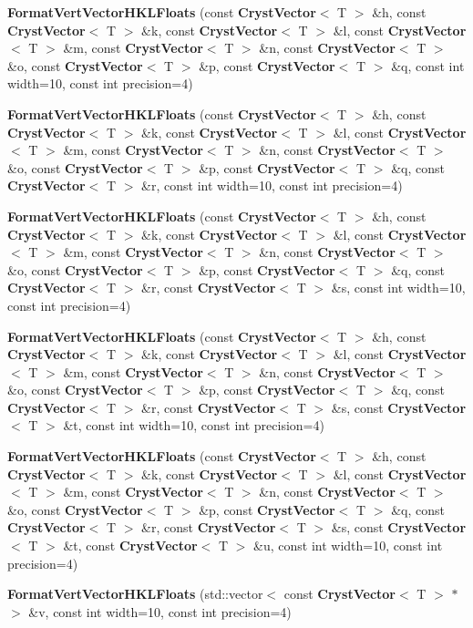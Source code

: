\begin{DoxyCompactItemize}
\item 
{\bfseries FormatVertVectorHKLFloats} (const {\bf CrystVector}$<$ T $>$ \&h, const {\bf CrystVector}$<$ T $>$ \&k, const {\bf CrystVector}$<$ T $>$ \&l, const {\bf CrystVector}$<$ T $>$ \&m, const {\bf CrystVector}$<$ T $>$ \&n, const {\bf CrystVector}$<$ T $>$ \&o, const {\bf CrystVector}$<$ T $>$ \&p, const {\bf CrystVector}$<$ T $>$ \&q, const int width=10, const int precision=4)\label{a00033_acb9f12201a79cd8e7007a9d25da07ff4}

\item 
{\bfseries FormatVertVectorHKLFloats} (const {\bf CrystVector}$<$ T $>$ \&h, const {\bf CrystVector}$<$ T $>$ \&k, const {\bf CrystVector}$<$ T $>$ \&l, const {\bf CrystVector}$<$ T $>$ \&m, const {\bf CrystVector}$<$ T $>$ \&n, const {\bf CrystVector}$<$ T $>$ \&o, const {\bf CrystVector}$<$ T $>$ \&p, const {\bf CrystVector}$<$ T $>$ \&q, const {\bf CrystVector}$<$ T $>$ \&r, const int width=10, const int precision=4)\label{a00033_a8d5ee53cb53c61b1909657e1e696b86b}

\item 
{\bfseries FormatVertVectorHKLFloats} (const {\bf CrystVector}$<$ T $>$ \&h, const {\bf CrystVector}$<$ T $>$ \&k, const {\bf CrystVector}$<$ T $>$ \&l, const {\bf CrystVector}$<$ T $>$ \&m, const {\bf CrystVector}$<$ T $>$ \&n, const {\bf CrystVector}$<$ T $>$ \&o, const {\bf CrystVector}$<$ T $>$ \&p, const {\bf CrystVector}$<$ T $>$ \&q, const {\bf CrystVector}$<$ T $>$ \&r, const {\bf CrystVector}$<$ T $>$ \&s, const int width=10, const int precision=4)\label{a00033_a7db9be5bdbb73648664b87151e736ecd}

\item 
{\bfseries FormatVertVectorHKLFloats} (const {\bf CrystVector}$<$ T $>$ \&h, const {\bf CrystVector}$<$ T $>$ \&k, const {\bf CrystVector}$<$ T $>$ \&l, const {\bf CrystVector}$<$ T $>$ \&m, const {\bf CrystVector}$<$ T $>$ \&n, const {\bf CrystVector}$<$ T $>$ \&o, const {\bf CrystVector}$<$ T $>$ \&p, const {\bf CrystVector}$<$ T $>$ \&q, const {\bf CrystVector}$<$ T $>$ \&r, const {\bf CrystVector}$<$ T $>$ \&s, const {\bf CrystVector}$<$ T $>$ \&t, const int width=10, const int precision=4)\label{a00033_a4447e13944800430f8dfd62561620ddf}

\item 
{\bfseries FormatVertVectorHKLFloats} (const {\bf CrystVector}$<$ T $>$ \&h, const {\bf CrystVector}$<$ T $>$ \&k, const {\bf CrystVector}$<$ T $>$ \&l, const {\bf CrystVector}$<$ T $>$ \&m, const {\bf CrystVector}$<$ T $>$ \&n, const {\bf CrystVector}$<$ T $>$ \&o, const {\bf CrystVector}$<$ T $>$ \&p, const {\bf CrystVector}$<$ T $>$ \&q, const {\bf CrystVector}$<$ T $>$ \&r, const {\bf CrystVector}$<$ T $>$ \&s, const {\bf CrystVector}$<$ T $>$ \&t, const {\bf CrystVector}$<$ T $>$ \&u, const int width=10, const int precision=4)\label{a00033_a565928926675ff9bda3642f99121cc61}

\item 
{\bfseries FormatVertVectorHKLFloats} (std::vector$<$ const {\bf CrystVector}$<$ T $>$ $\ast$ $>$ \&v, const int width=10, const int precision=4)\label{a00033_a9be8620f71ff33ec8488c88c65c4cf02}

\end{DoxyCompactItemize}
